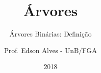 \title{Árvores}
\subtitle{Árvores Binárias: Definição}
\author{Prof. Edson Alves - UnB/FGA}
\date{2018}
